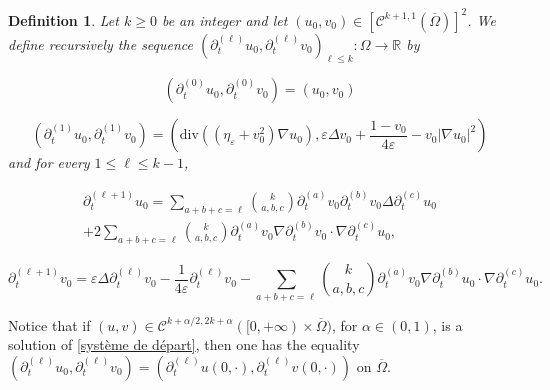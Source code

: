 \documentclass[reqno,12pt,twoside]{amsart}
\newtheorem{definition}{Definition}[section]
\numberwithin{equation}{section} \numberwithin{theorem}{section}
\numberwithin{proposition}{section} \numberwithin{lemma}{section}
\numberwithin{corollary}{section}
\numberwithin{definition}{section} \numberwithin{remark}{section}
\begin{document}
\smallskip

\begin{definition}\label{def : compatibilité}
Let $k\geqslant 0$ be an integer and let $(u_0,v_0)\in [\mathcal{C}^{k+1,1}(\overline{\Omega})]^2$. We define recursively the sequence $(\partial_t^{(\ell)} u_0, \partial_t^{(\ell)} v_0)_{\ell \leqslant k} : \Omega \rightarrow \mathbb{R}$ by 

\[(\partial_t^{(0)} u_0, \partial_t^{(0)} v_0) = (u_0, v_0)\]

\[(\partial_t^{(1)} u_0, \partial_t^{(1)} v_0) = \left(\text{div}((\eta_\varepsilon+ v_0^2)\nabla u_0), \varepsilon \Delta v_0 + \dfrac{1-v_0}{4\varepsilon} - v_0 |\nabla u_0|^2\right)\]
and for every $1 \leqslant \ell \leqslant k-1$, 

\begin{multline*}
\partial_t^{(\ell+1)} u_0 = \sum_{a+b+c=\ell} \binom{k}{a,b,c} \partial_t^{(a)} v_0 \partial_t^{(b)} v_0 \Delta \partial_t^{(c)} u_0 \\
+ 2\sum_{a+b+c=\ell} \binom{k}{a,b,c} \partial_t^{(a)} v_0 \nabla \partial_t^{(b)} v_0 \cdot \nabla \partial_t^{(c)} u_0,
\end{multline*}

\[\partial_t^{(\ell +1)} v_0 = \varepsilon \Delta \partial_t^{(\ell)} v_0 - \frac{1}{4\varepsilon} \partial_t^{(\ell)} v_0
 - \sum_{a+b+c=\ell} \binom{k}{a,b,c} \partial_t^{(a)} v_0 \nabla \partial_t^{(b)} u_0 \cdot \nabla \partial_t^{(c)} u_0.\]
\end{definition}

Notice that if $(u, v)\in \mathcal{C}^{k+\alpha/2, 2k+\alpha}([0,+\infty)\times \overline{\Omega})$, for $\alpha \in (0,1)$, is a solution of \eqref{système de départ}, then one has the equality $(\partial_t^{(\ell)} u_0, \partial_t^{(\ell)} v_0) = (\partial_t^{(\ell)} u(0, \cdot) , \partial_t^{(\ell)} v(0, \cdot))$ on $\overline{\Omega}$. 

\smallskip
\end{document}
